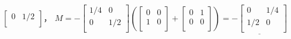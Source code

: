 \documentclass{jsarticle}
\theoremstyle{definition}
\begin{document}
\begin{enumerate}[(a)]
\begin{math}
\begin{bmatrix}
        0 & 1/2 \\
        \end{bmatrix}        
    \end{math}，
    \begin{math}
      M= -
      \begin{bmatrix}
        1/4 & 0 \\
        0 & 1/2 \\
      \end{bmatrix}
      \left(
        \begin{bmatrix}
          0 & 0 \\
          1 & 0 \\
        \end{bmatrix}
        +
        \begin{bmatrix}
          0 & 1 \\
          0 & 0 \\
        \end{bmatrix}
      \right)
      = \underline{-
      \begin{bmatrix}
        0 & 1/4 \\
        1/2 & 0 \\
      \end{bmatrix} 
      }
    \end{math}


\end{enumerate}
\end{document}
